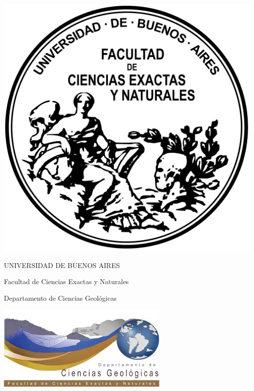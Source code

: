 \documentclass[11pt,a4paper]{article}
\begin{document}
\begin{titlepage}

\noindent
\begin{minipage}[c]{0.2\textwidth}
  \includegraphics[width=\linewidth]{Logo-fcenuba.png}
\end{minipage}
\hfill
\begin{minipage}[c]{0.4\textwidth}
  \centering
  \vspace*{5.5em}  %
  {UNIVERSIDAD DE BUENOS AIRES \par}
  \vspace{0.1cm}
  {\large Facultad de Ciencias Exactas y Naturales\par}
  \vspace{0.1cm}
  {\large Departamento de Ciencias Geológicas \par}
\end{minipage}
\hfill
\begin{minipage}[c]{0.2\textwidth}
  \includegraphics[width=\linewidth]{Logo_Geologia.png}
\end{minipage}


\end{titlepage}
\end{document}
